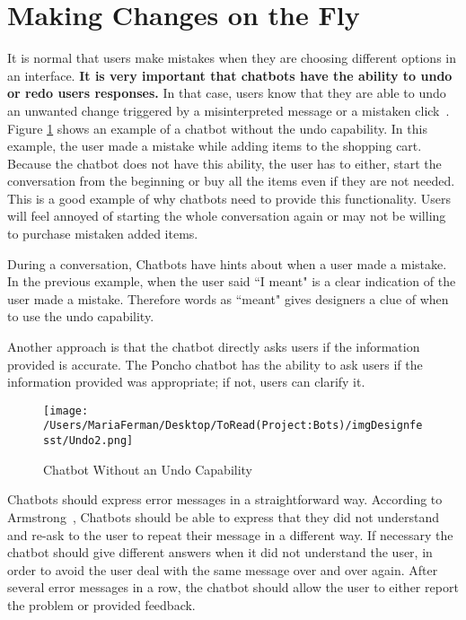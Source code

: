 \documentclass[a4paper,10pt]{article}
\begin{document}
\section{Making Changes on the Fly}

It is normal that users make mistakes when they are choosing different options in an interface. \textbf{It is very important that chatbots have the ability to undo or redo users responses.} In that case, users know that they are able to undo an unwanted change triggered by a misinterpreted message or a mistaken click~\cite{HeuristicsWebPage}. %
Figure \ref{FigureUndo} shows an example of a chatbot without the undo capability. In this example, the user made a mistake while adding items to the shopping cart. Because the chatbot does not have this ability, the user has to either, start the conversation from the beginning or buy all the items even if they are not needed. This is a good example of why chatbots need to provide this functionality. Users will feel annoyed of starting the whole conversation again or may not be willing to purchase mistaken added items. 

During a conversation, Chatbots have hints about when a user made a mistake. In the previous example, when the user said ``I meant" is a clear indication of the user made a mistake. Therefore words as ``meant" gives designers a clue of when to use the undo capability.

Another approach is that the chatbot directly asks users if the information provided is accurate. The Poncho chatbot has the ability to ask users if the information provided was appropriate; if not, users can clarify it.  

\begin{figure}
\centering
\texttt{[image: /Users/MariaFerman/Desktop/ToRead(Project:Bots)/imgDesignfesst/Undo2.png]}
\caption{Chatbot Without an Undo Capability}
\label{FigureUndo}
\end{figure}


Chatbots should express error messages in a straightforward way. According to Armstrong~\cite{HelpingYourBabyBotLearnToChat}, Chatbots should be able to express that they did not understand and re-ask to the user to repeat their message in a different way. If necessary the chatbot should give different answers when it did not understand the user, in order to avoid the user deal with the same message over and over again. After several error messages in a row, the chatbot should allow the user to either report the problem or provided feedback.
\end{document}
